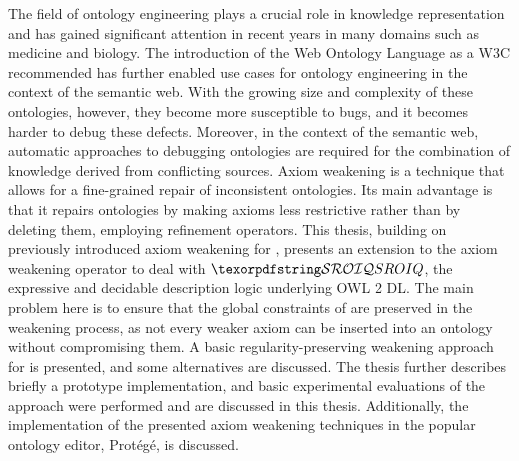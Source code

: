 
The field of ontology engineering plays a crucial role in knowledge representation and has gained significant attention in recent years in many domains such as medicine and biology. The introduction of the Web Ontology Language as a W3C recommended has further enabled use cases for ontology engineering in the context of the semantic web. With the growing size and complexity of these ontologies, however, they become more susceptible to bugs, and it becomes harder to debug these defects. Moreover, in the context of the semantic web, automatic approaches to debugging ontologies are required for the combination of knowledge derived from conflicting sources. Axiom weakening is a technique that allows for a fine-grained repair of inconsistent ontologies. Its main advantage is that it repairs ontologies by making axioms less restrictive rather than by deleting them, employing refinement operators. This thesis, building on previously introduced axiom weakening for \ALC, presents an extension to the axiom weakening operator to deal with $\SROIQ$, the expressive and decidable description logic underlying OWL 2 DL. The main problem here is to ensure that the global constraints of \SROIQ are preserved in the weakening process, as not every weaker axiom can be inserted into an ontology without compromising them. A basic regularity-preserving weakening approach for \SROIQ is presented, and some alternatives are discussed. The thesis further describes briefly a prototype implementation, and basic experimental evaluations of the approach were performed and are discussed in this thesis. Additionally, the implementation of the presented axiom weakening techniques in the popular ontology editor, Protégé, is discussed.
